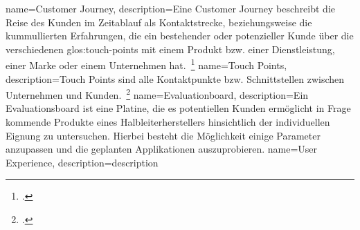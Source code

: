 {
	name={Customer Journey},
	description={Eine Customer Journey beschreibt die Reise des Kunden im Zeitablauf als Kontaktstrecke, beziehungsweise die kummullierten Erfahrungen, die ein bestehender oder potenzieller Kunde über die verschiedenen \Gls{glos:touch-points} mit einem Produkt bzw. einer Dienstleistung, einer Marke oder einem Unternehmen hat.~\footcite[S.~36--37]{Appelfeller.2018}}
}
{
	name={Touch Points},
	description={Touch Points sind alle Kontaktpunkte bzw. Schnittstellen zwischen Unternehmen und Kunden.~\footcite[S.~37]{Appelfeller.2018}}
}
{
	name={Evaluationboard},
	description={Ein Evaluationsboard ist eine Platine, die es potentiellen Kunden ermöglicht in Frage kommende Produkte eines Halbleiterherstellers hinsichtlich der individuellen Eignung zu untersuchen. Hierbei besteht die Möglichkeit einige Parameter anzupassen und die geplanten Applikationen auszuprobieren.}
}
{
	name={User Experience},
	description={description}
}